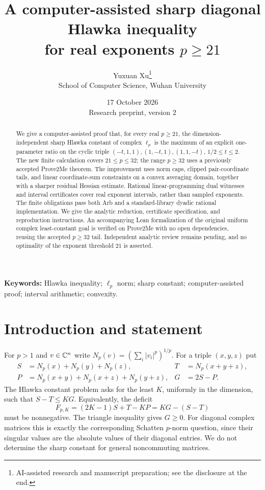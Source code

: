 \documentclass[11pt,a4paper]{article}
\title{A computer-assisted sharp diagonal Hlawka inequality\protect\\for real exponents $p\ge21$}
\author{Yuxuan Xu\thanks{AI-assisted research and manuscript preparation; see the disclosure at the end.}\\
School of Computer Science, Wuhan University}
\date{17 October 2026\\\small Research preprint, version 2}
\theoremstyle{remark}\newtheorem{remark}[theorem]{Remark}
\newcommand{\Np}{N_p}\newcommand{\F}{F_{p,K}}
\begin{document}
\maketitle
\begin{abstract}
We give a computer-assisted proof that, for every real $p\ge21$, the
dimension-independent sharp Hlawka constant of complex $\ell_p$ is the
maximum of an explicit one-parameter ratio on the cyclic triple
$(-t,1,1),(1,-t,1),(1,1,-t)$, $1/2\le t\le2$.
The new finite calculation covers $21\le p\le32$; the range $p\ge32$
uses a previously accepted Prove2Me theorem. The improvement uses norm
caps, clipped pair-coordinate tails, and linear coordinate-sum constraints
on a convex averaging domain, together with a sharper residual Hessian
estimate. Rational linear-programming dual witnesses and interval
certificates cover real exponent intervals, rather than sampled exponents.
The finite obligations pass both Arb and a standard-library dyadic rational
implementation. We give the analytic reduction, certificate specification,
and reproduction instructions. An accompanying Lean formalization of the
original uniform complex least-constant goal is verified on Prove2Me with
no open dependencies, reusing the accepted $p\ge32$ tail. Independent
analytic review remains pending, and no optimality of the exponent
threshold $21$ is asserted.
\end{abstract}
\noindent\textbf{Keywords:} Hlawka inequality; $\ell_p$ norm; sharp constant;
computer-assisted proof; interval arithmetic; convexity.

\section{Introduction and statement}
For $p>1$ and $v\in\mathbb C^n$ write $\Np(v)=(\sum_i|v_i|^p)^{1/p}$.
For a triple $(x,y,z)$ put
\begin{align}
S&=\Np(x)+\Np(y)+\Np(z),& T&=\Np(x+y+z),\nonumber\\
P&=\Np(x+y)+\Np(x+z)+\Np(y+z),& G&=2S-P.\label{eq:defs}
\end{align}
The Hlawka constant problem asks for the least $K$, uniformly in the
dimension, such that $S-T\le KG$. Equivalently, the deficit
\begin{equation}\label{eq:F}
\F=(2K-1)S+T-KP=KG-(S-T)
\end{equation}
must be nonnegative. The triangle inequality gives $G\ge0$.
For diagonal complex matrices this is exactly the corresponding Schatten
$p$-norm question, since their singular values are the absolute values of
their diagonal entries. We do not determine the sharp constant for general
noncommuting matrices.
\end{document}
